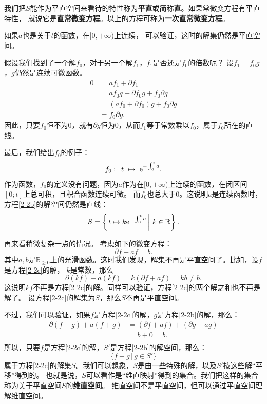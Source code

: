 \documentclass[12pt,UTF8,fontset=none]{ctexbook}
\begin{document}
我们把$S$能作为平直空间来看待的特性称为\textbf{平直}或简称\textbf{直}。如果常微变方程有平直特性，
就说它是\textbf{直常微变方程}。以上的方程可称为\textbf{一次直常微变方程}。

如果$a$也是关于$t$的函数，在$[0,+\infty)$上连续，
可以验证，这时的解集仍然是平直空间。

假设我们找到了一个解$f_0$，对于另一个解$f_1$，$f_1$是否还是$f_0$的倍数呢？
设$f_1 = f_0 g$，$g$仍然是连续可微函数。
\begin{align*}
    0 &= af_1 + \partial f_1 \\
    &= a f_0 g + \partial f_0 g + f_0 \partial g \\
    &= (af_0 + \partial f_0) g + f_0 \partial g \\
    &= f_0 \partial g.
\end{align*}
因此，只要$f_0$恒不为$0$，就有$\partial g$恒为$0$，从而$f_1$等于常数乘以$f_0$，属于$f_0$所在的直线。

最后，我们给出$f_0$的例子：
$$ f_0: \,\,\, t\,\, \mapsto \,\, \mathrm{e}^{-\int_0^t a}. $$
作为函数，$f_0$的定义没有问题，因为$a$作为在$[0,+\infty)$上连续的函数，在闭区间$[0; t]$上总可积，且积合函数连续可微。
而$f_0$也总大于$0$。这说明$a$是连续函数时，方程\eqref{2-2b}的解空间仍然是直线：
$$S = \left\{\left.t\mapsto k\mathrm{e}^{-\int_0^t a} \, \right| \, k\in\mathbb{R}\right\}.$$

再来看稍微复杂一点的情况。
考虑如下的微变方程：
\begin{equation}
    \partial f + a f = b. \label{2-2c}
\end{equation}
其中$a,b$是$\mathbb{R}_{\geqslant 0}$上的光滑函数。这时我们发现，解集不再是平直空间了。比如，设$f$是方程\eqref{2-2c}的解，
$k$是常数，那么
$$\partial (kf) + a (kf) = k (\partial f + a f) = kb \neq b.$$
这说明$kf$不再是方程\eqref{2-2c}的解。同样可以验证，方程\eqref{2-2c}的两个解之和也不再是解了。
设方程\eqref{2-2c}的解集为$S$，那么$S$不再是平直空间。

不过，我们可以验证，如果$f$是方程\eqref{2-2c}的解，$g$是方程\eqref{2-2b}的解，那么：
\begin{align*}
    \partial (f + g) + a (f + g) &= (\partial f + a f) + (\partial g + a g) \\
    &= b + 0 = b. \\ 
\end{align*}
所以，只要$f$是方程\eqref{2-2c}的解，$S'$是方程\eqref{2-2b}的解空间，那么：
$$ \{f + g \, | \, g\in S'\} $$
属于方程\eqref{2-2c}的解集$S$。我们可以想象，$S$是由一些特殊的解，以及$S'$按这些解“平移”得到的。
也就是说，$S$可以看作是“维直映射”得到的集合。我们把这样的集合称为关于平直空间$S$的\textbf{维直空间}。
维直空间不是平直空间，但可以通过平直空间理解维直空间。
\end{document}
